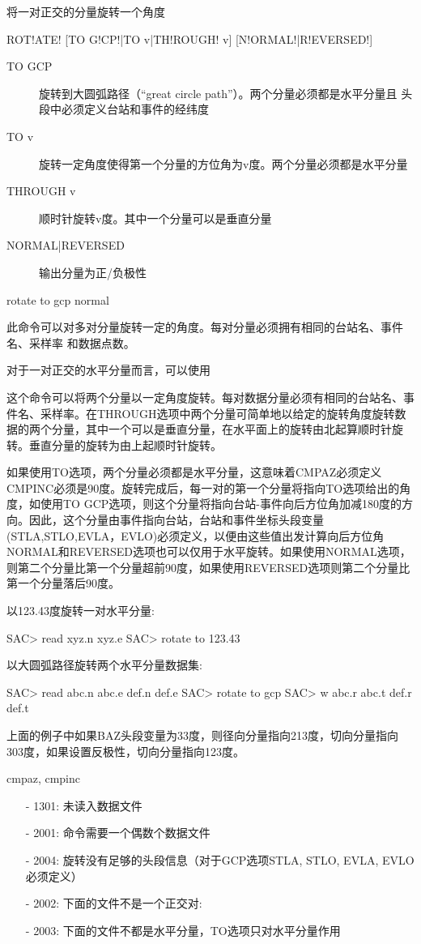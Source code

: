 \label{cmd:rotate}

将一对正交的分量旋转一个角度

\begin{SACSTX}
ROT!ATE! [TO G!CP!|TO v|TH!ROUGH! v] [N!ORMAL!|R!EVERSED!]
\end{SACSTX}

\begin{description}
\item [TO GCP] 旋转到大圆弧路径（``great circle path''）。两个分量必须都是水平分量且
    头段中必须定义台站和事件的经纬度
\item [TO v] 旋转一定角度使得第一个分量的方位角为v度。两个分量必须都是水平分量 
\item [THROUGH v] 顺时针旋转v度。其中一个分量可以是垂直分量
\item [NORMAL|REVERSED] 输出分量为正/负极性 
\end{description}

\begin{SACDFT}
rotate to gcp normal
\end{SACDFT}

此命令可以对多对分量旋转一定的角度。每对分量必须拥有相同的台站名、事件名、采样率
和数据点数。

对于一对正交的水平分量而言，可以使用

这个命令可以将两个分量以一定角度旋转。每对数据分量必须有相同的台站名、事件名、采样率。在THROUGH选项中两个分量可简单地以给定的旋转角度旋转数据的两个分量，其中一个可以是垂直分量，在水平面上的旋转由北起算顺时针旋转。垂直分量的旋转为由上起顺时针旋转。

如果使用TO选项，两个分量必须都是水平分量，这意味着CMPAZ必须定义CMPINC必须是90度。旋转完成后，每一对的第一个分量将指向TO选项给出的角度，如使用TO GCP选项，则这个分量将指向台站-事件向后方位角加减180度的方向。因此，这个分量由事件指向台站，台站和事件坐标头段变量(STLA,STLO,EVLA，EVLO)必须定义，以便由这些值出发计算向后方位角NORMAL和REVERSED选项也可以仅用于水平旋转。如果使用NORMAL选项，则第二个分量比第一个分量超前90度，如果使用REVERSED选项则第二个分量比第一个分量落后90度。

以123.43度旋转一对水平分量:
\begin{SACCode}
SAC> read xyz.n xyz.e
SAC> rotate to 123.43
\end{SACCode}

以大圆弧路径旋转两个水平分量数据集:
\begin{SACCode}
SAC> read abc.n abc.e def.n def.e
SAC> rotate to gcp
SAC> w abc.r abc.t def.r def.t
\end{SACCode}
上面的例子中如果BAZ头段变量为33度，则径向分量指向213度，切向分量指向303度，如果设置反极性，切向分量指向123度。

cmpaz, cmpinc

\begin{itemize}
\item[-]1301: 未读入数据文件
\item[-]2001: 命令需要一个偶数个数据文件
\item[-]2004: 旋转没有足够的头段信息（对于GCP选项STLA, STLO, EVLA, EVLO必须定义）
\item[-]2002: 下面的文件不是一个正交对:
\item[-]2003: 下面的文件不都是水平分量，TO选项只对水平分量作用
\end{itemize}
